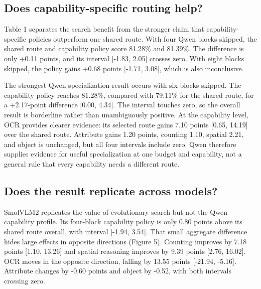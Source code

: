 \documentclass[10pt]{article}
\begin{document}
\subsection{Does capability-specific routing help?}\label{does-capability-specific-routing-help}

Table 1 separates the search benefit from the stronger claim that
capability-specific policies outperform one shared route. With four Qwen
blocks skipped, the shared route and capability policy score 81.28\% and
81.39\%. The difference is only +0.11 points, and its interval {[}-1.83,
2.05{]} crosses zero. With eight blocks skipped, the policy gains +0.68
points {[}-1.71, 3.08{]}, which is also inconclusive.

\begin{table}[t]
\centering
\caption{Matched-budget selection accuracy. A shared route uses one block set for every question; a capability-specific policy uses one same-size route per known capability label.}
\label{tab:main-results}
\resizebox{\linewidth}{!}{}
\end{table}

The strongest Qwen specialization result occurs with six blocks skipped.
The capability policy reaches 81.28\%, compared with 79.11\% for the
shared route, for a +2.17-point difference {[}0.00, 4.34{]}. The
interval touches zero, so the overall result is borderline rather than
unambiguously positive. At the capability level, OCR provides clearer
evidence: its selected route gains 7.10 points {[}0.65, 14.19{]} over
the shared route. Attribute gains 1.20 points, counting 1.10, spatial
2.21, and object is unchanged, but all four intervals include zero. Qwen
therefore supplies evidence for useful specialization at one budget and
capability, not a general rule that every capability needs a different
route.

\subsection{Does the result replicate across models?}\label{does-the-result-replicate-across-models}

SmolVLM2 replicates the value of evolutionary search but not the Qwen
capability profile. Its four-block capability policy is only 0.80 points
above its shared route overall, with interval {[}-1.94, 3.54{]}. That
small aggregate difference hides large effects in opposite directions
(Figure 5). Counting improves by 7.18 points {[}1.10, 13.26{]} and
spatial reasoning improves by 9.39 points {[}2.76, 16.02{]}. OCR moves
in the opposite direction, falling by 13.55 points {[}-21.94, -5.16{]}.
Attribute changes by -0.60 points and object by -0.52, with both
intervals crossing zero.
\end{document}
